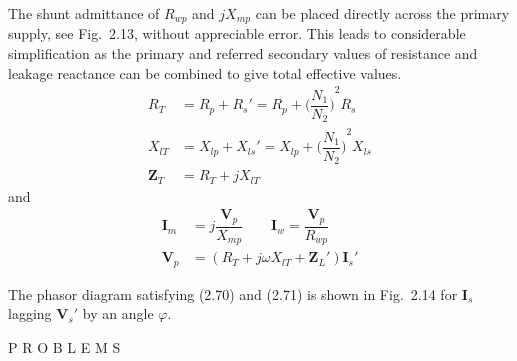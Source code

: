 \documentclass[a4paper,numbers=noenddot,12pt]{scrbook}
\begin{document}
                The shunt admittance of $R_{wp}$ and $jX_{mp}$ can be placed directly across the primary supply, see Fig.\ 2.13, without appreciable error. This leads to considerable simplification as the primary and referred secondary values of resistance and leakage reactance can be combined to give total effective values.
                \begin{equation}
                    \begin{aligned}
                        R_T & = R_p + R_s' = R_p + {\Big( \dfrac{N_1}{N_2}\Big)}^2 R_s \\
                        X_{lT} & = X_{lp} + X_{ls}' = X_{lp} + {\Big( \dfrac{N_1}{N_2}\Big)}^2 X_{ls} \\
                        \mathbf{Z}_T & = R_T + jX_{lT}
                    \end{aligned}
                    \label{eq:Eq2.69}
                \end{equation}
                and
                \begin{align}
                    \mathbf{I}_m & = j \dfrac{\mathbf{V}_p}{X_{mp}} \qquad \mathbf{I}_w = \dfrac{\mathbf{V}_p}{R_{wp}} \\
                    \mathbf{V}_p & = (R_T + j \omega X_{lT} + \mathbf{Z}_L')\mathbf{I}_s'
                    \label{eq:Eq2.71}
                \end{align}

                The phasor diagram satisfying (2.70) and (2.71) is shown in Fig.\ 2.14 for $\mathbf{I}_s$ lagging $\mathbf{V}_s'$ by an angle $\varphi$.

                \begingroup
                \fontsize{10pt}{12pt}\selectfont
                \begin{center}
                    P R O B L E M S
                \end{center}
\end{document}
